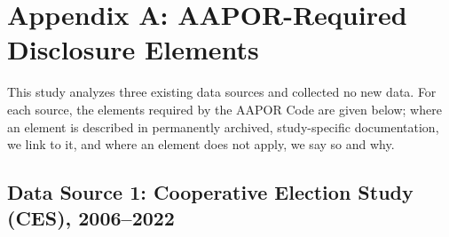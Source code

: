 \documentclass[12pt]{article}
\begin{document}
\printbibliography
\clearpage

\appendix


\section*{Appendix A: AAPOR-Required Disclosure Elements}
{}
\label{app:disclosure}

This study analyzes three existing data sources and collected no new data. For each source, the elements required by the AAPOR Code are given below; where an element is described in permanently archived, study-specific documentation, we link to it, and where an element does not apply, we say so and why.

\subsection*{Data Source 1: Cooperative Election Study (CES), 2006--2022}
\end{document}
